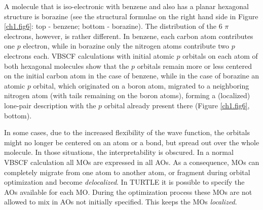 A molecule that is iso-electronic with benzene and also has a planar hexagonal structure is borazine (see the structural formulae on the right hand side in Figure \ref{ch1.fig6}: top - benzene; bottom - borazine). The distribution of the 6 $\pi$ electrons, however, is rather different. In benzene, each carbon atom contributes one $p$ electron, while in borazine only the nitrogen atoms contribute two $p$ electrons each. VBSCF calculations with initial atomic $p$ orbitals on each atom of both hexagonal molecules show that the $p$ orbitals remain more or less centered on the initial carbon atom in the case of benzene,  while in the case of borazine an atomic $p$ orbital, which originated on a boron atom, migrated to a neighboring nitrogen atom (with tails remaining on the boron atoms), forming a (localized) lone-pair description with the $p$ orbital already present there (Figure \ref{ch1.fig6}, bottom).

In some cases, due to the increased flexibility of the wave function, the orbitals might no longer be centered on an atom or a bond, but spread out over the whole molecule. In those situations, the interpretability is obscured. In a normal VBSCF calculation all MOs are expressed in all AOs. As a consequence, MOs can completely migrate from one atom to another atom, or fragment during orbital optimization and become \textit{delocalized}. In TURTLE it is possible to specify the AOs available for each MO. During the optimization process these MOs are not allowed to mix in AOs not initially specified. This keeps the MOs \textit{localized}. 

